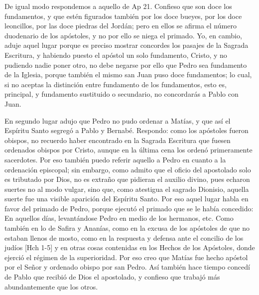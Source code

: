 De igual modo respondemos a aquello de Ap 21. Confieso que son doce los fundamentos, y que estén figurados también por los doce bueyes, por los doce leoncillos, por las doce piedras del Jordán; pero en ellos se afirma el número duodenario de los apóstoles, y no por ello se niega el primado. Yo, en cambio, aduje aquel lugar porque es preciso mostrar concordes los pasajes de la Sagrada Escritura, y habiendo puesto el apóstol un solo fundamento, Cristo, y no pudiendo nadie poner otro, no debe negarse por ello que Pedro sea fundamento de la Iglesia, porque también el mismo san Juan puso doce fundamentos; lo cual, si no aceptas la distinción entre fundamento de los fundamentos, esto es, principal, y fundamento sustituido o secundario, no concordarás a Pablo con Juan.

En segundo lugar adujo que Pedro no pudo ordenar a Matías, y que así el Espíritu Santo segregó a Pablo y Bernabé. Respondo: como los apóstoles fueron obispos, no recuerdo haber encontrado en la Sagrada Escritura que fuesen ordenados obispos por Cristo, aunque en la última cena los ordenó primeramente sacerdotes. Por eso también puedo referir aquello a Pedro en cuanto a la ordenación episcopal; sin embargo, como admito que el oficio del apostolado solo es tributado por Dios, no es extraño que pidieran el auxilio divino, pues echaron suertes no al modo vulgar, sino que, como atestigua el sagrado Dionisio, aquella suerte fue una visible aparición del Espíritu Santo. Por eso aquel lugar habla en favor del primado de Pedro, porque ejecutó el primado que se le había concedido: En aquellos días, levantándose Pedro en medio de los hermanos, etc. Como también en lo de Safira y Ananías, como en la excusa de los apóstoles de que no estaban llenos de mosto, como en la respuesta y defensa ante el concilio de los judíos [Hch 1-5] y en otras cosas contenidas en los Hechos de los Apóstoles, donde ejerció el régimen de la superioridad. Por eso creo que Matías fue hecho apóstol por el Señor y ordenado obispo por san Pedro. Así también hace tiempo concedí de Pablo que recibió de Dios el apostolado, y confieso que trabajó más abundantemente que los otros.

